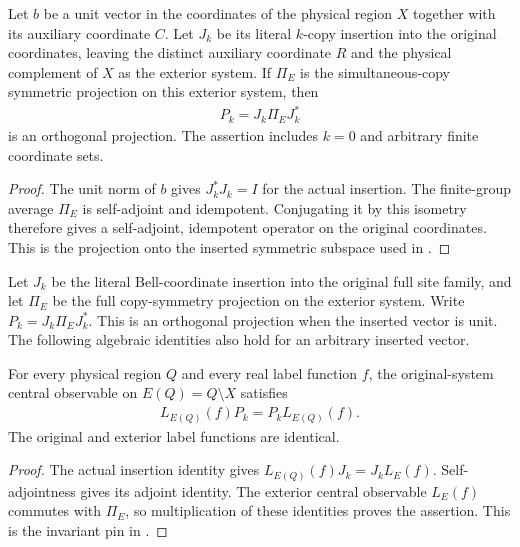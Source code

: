 \begin{theorem}
    \label{thm:bell_symmetric_pin_projection}
    \leanok
    Let $b$ be a unit vector in the coordinates of the physical region $X$
    together with its auxiliary coordinate $C$. Let $J_k$ be its literal
    $k$-copy insertion into the original coordinates, leaving the distinct
    auxiliary coordinate $R$ and the physical complement of $X$ as the
    exterior system. If $\Pi_E$ is the simultaneous-copy symmetric
    projection on this exterior system, then
    \begin{align*}
        P_k=J_k\Pi_EJ_k^*
    \end{align*}
    is an orthogonal projection. The assertion includes $k=0$ and
    arbitrary finite coordinate sets.
\end{theorem}
\begin{proof}\leanok
    The unit norm of $b$ gives $J_k^*J_k=I$ for the actual insertion.
    The finite-group average $\Pi_E$ is self-adjoint and idempotent.
    Conjugating it by this isometry therefore gives a self-adjoint,
    idempotent operator on the original coordinates. This is the
    projection onto the inserted symmetric subspace used in
    \cite[\texttt{07-comparators.tex}, lines 283--308,
    \texttt{comparator:pinned-metric}]{OpenAI2026AreaLaw}.
\end{proof}

Let $J_k$ be the literal Bell-coordinate insertion into the original full
site family, and let $\Pi_E$ be the full copy-symmetry projection on the
exterior system. Write $P_k=J_k\Pi_EJ_k^*$. This is an orthogonal projection
when the inserted vector is unit. The following algebraic identities also
hold for an arbitrary inserted vector.

\begin{theorem}
    \label{thm:exterior_labels_bell_pin}
    \leanok
    For every physical region $Q$ and every real label function $f$, the
    original-system central observable on $E(Q)=Q\setminus X$ satisfies
    \begin{align*}
        L_{E(Q)}(f)P_k=P_kL_{E(Q)}(f).
    \end{align*}
    The original and exterior label functions are identical.
\end{theorem}
\begin{proof}\leanok
    The actual insertion identity gives $L_{E(Q)}(f)J_k=J_kL_E(f)$.
    Self-adjointness gives its adjoint identity. The exterior central
    observable $L_E(f)$ commutes with $\Pi_E$, so multiplication of these
    identities proves the assertion. This is the invariant pin in
    \cite[\texttt{07-comparators.tex}, lines 291--308,
    \texttt{comparator:pinned-metric}]{OpenAI2026AreaLaw}.
\end{proof}

